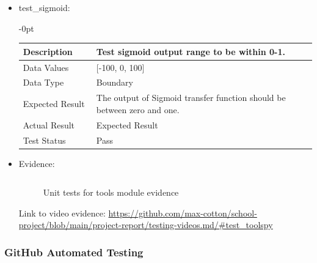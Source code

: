 \documentclass[./project-report/src/latex/project-report.tex]{subfiles}
\begin{document}
\begin{itemize}
\begin{itemize}
\begin{itemize}
					\item test\_sigmoid: \newline
					\begin{adjustwidth}{-\leftmargin}{0pt}
					\begin{tabular}{|p{0.25\linewidth}|p{0.75\linewidth}|}
						\hline
						Description & Test sigmoid output range to be within 0-1. \\
						\hline
						Data Values & [-100, 0, 100] \\
						\hline
						Data Type & Boundary \\
						\hline
						Expected Result & The output of Sigmoid transfer function should be between zero and one. \\
						\hline
						Actual Result & Expected Result \\
						\hline
						Test Status & Pass \\
						\hline
					\end{tabular}
					\end{adjustwidth}

					\vspace{5mm}

					\item Evidence:
                		\inputminted{python}{./school_project/test/models/cpu/utils/test_tools.py}

						\pagebreak

						\begin{figure}[h!]
						\centering
						\caption{Unit tests for tools module evidence}
						\end{figure}
	
						Link to video evidence: \url{https://github.com/max-cotton/school-project/blob/main/project-report/testing-videos.md/#test_toolspy}
				\end{itemize}
        \end{itemize}
\end{itemize}

\subsubsection{GitHub Automated Testing}
\end{document}
